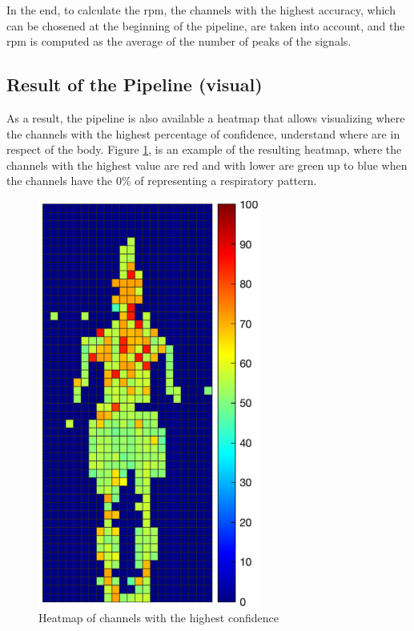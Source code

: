 In the end, to calculate the rpm, the channels with the highest accuracy, which can be chosened at the beginning of the pipeline, are taken into account, and the rpm is computed as the average of the number of peaks of the signals.

\subsection{Result of the Pipeline (visual)}
As a result, the pipeline is also available a heatmap that allows visualizing where the channels with the highest percentage of confidence, understand where are in respect of the body. Figure \ref{fig:heat}, is an example of the resulting heatmap, where the channels with the highest value are red and with lower are green up to blue when the channels have the 0\% of representing a respiratory pattern.

\begin{figure}[H]
    \centering
    \includegraphics[width=0.65\textwidth]{img/total.png}
    \caption{Heatmap of channels with the highest confidence}
    \label{fig:heat}
\end{figure}
